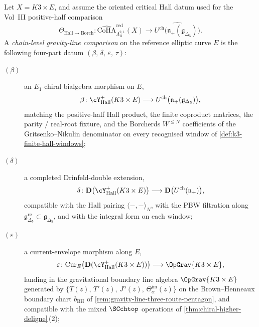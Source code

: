 \begin{conjecture}
\label{conj:gravity-line-hall-borcherds-comparison}
%
%
%
Let $X = K3 \times E$, and assume the oriented critical Hall datum
used for the Vol~III positive-half comparison
\[
\Theta_{\mathrm{Hall}\to\mathrm{Borch}}\colon
\widehat{\mathrm{CoHA}}^{\mathrm{red}}_{\Lambda^{2,1}_{\mathrm{II}}}(X)
\longrightarrow
\widehat{U^{\mathrm{ch}}\bigl(\mathfrak n_+(\mathfrak g_{\Delta_5})\bigr)}.
\]
A \emph{chain-level gravity-line comparison} on the reference elliptic
curve $E$ is the following four-part datum
$(\beta,\, \delta,\, \varepsilon,\, \tau)$:
\begin{description}
\item[$(\beta)$] an $E_{1}$-chiral bialgebra morphism on $E$,
\[
 \beta\colon \cY^{+}_{\mathrm{Hall}}(K3 \times E)
 \longrightarrow U^{\mathrm{ch}}\bigl(\mathfrak n_{+}(\mathfrak g_{\Delta_5})\bigr),
\]
matching the positive-half Hall product, the finite coproduct
matrices, the parity / real-root fixture, and the Borcherds
$W^{\le N}$ coefficients of the Gritsenko--Nikulin denominator on
every recognised window of
\cref{def:k3-finite-hall-windows};

\item[$(\delta)$] a completed Drinfeld-double extension,
\[
 \delta\colon
 \mathbf{D}\bigl(\cY^{+}_{\mathrm{Hall}}(K3 \times E)\bigr)
 \longrightarrow
 \mathbf{D}\bigl(U^{\mathrm{ch}}(\mathfrak n_{+})\bigr),
\]
compatible with the Hall pairing $\langle - , - \rangle_{N}$, with the
PBW filtration along
$\mathfrak g_{\Delta_5}^{\mathrm{re}} \subset \mathfrak g_{\Delta_5}$,
and with the integral form on each window;

\item[$(\varepsilon)$] a current-envelope morphism along $E$,
\[
 \varepsilon\colon
 \mathrm{Cur}_{E}\bigl(\mathbf{D}(\cY^{+}_{\mathrm{Hall}}(K3 \times E))\bigr)
 \longrightarrow
 \OpGrav{K3 \times E},
\]
landing in the gravitational boundary line algebra
$\OpGrav{K3 \times E}$ generated by
$\{T(z),\, T'(z),\, J^{a}(z),\, \Theta^{\mathrm{im}}_{\alpha}(z)\}$ on
the Brown--Henneaux boundary chart $b_{\mathrm{BH}}$ of
\cref{rem:gravity-line-three-route-pentagon}, and compatible with the
mixed $\SCchtop$ operations of
\cref{thm:chiral-higher-deligne}\,(2);


\end{description}
\end{conjecture}
